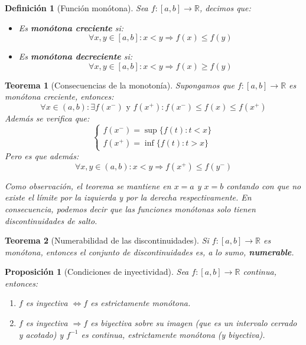 \documentclass[10pt,a4paper,openright]{book}
\newtheorem{teorema}{Teorema}[chapter]
\newtheorem{proposicion}{Proposición}[chapter]
\newtheorem{definicion}{Definición}[chapter]
\begin{document}
\begin{definicion}[Función monótona]
Sea $f:[a,b]\rightarrow \mathbb R$, decimos que:
\begin{itemize}
\item Es \textbf{monótona creciente} si:
$$\forall x,y\in [a,b]: x<y\Rightarrow f(x)\leq f(y)$$

\item Es \textbf{monótona decreciente} si:
$$\forall x,y\in [a,b]: x<y\Rightarrow f(x)\geq f(y)$$
\end{itemize}
\end{definicion}

\begin{teorema}[Consecuencias de la monotonía]
Supongamos que $f:[a,b]\rightarrow \mathbb R$ es monótona creciente, entonces:
$$\forall x\in (a,b):\exists f(x^-)\mbox{ y }f(x^+): f(x^-)\leq f(x)\leq f(x^+)$$
Además se verifica que:
$$\begin{cases}f(x^-)=\sup\{f(t): t<x\} \\ f(x^+)=\inf\{f(t): t>x\}\end{cases}$$
Pero es que además:
$$\forall x,y\in (a,b): x<y\Rightarrow f(x^+)\leq f(y^-)$$

Como observación, el teorema se mantiene en $x=a$ y $x=b$ contando con que no existe el límite por la izquierda y por la derecha respectivamente. En consecuencia, podemos decir que las funciones monótonas solo tienen discontinuidades de salto.
\end{teorema}

\begin{teorema}[Numerabilidad  de las discontinuidades]
Si $f:[a,b]\rightarrow \mathbb R$ es monótona, entonces el conjunto de discontinuidades es, a lo sumo, \textbf{numerable}.
\end{teorema}

\begin{proposicion}[Condiciones de inyectividad]
Sea $f:[a,b]\rightarrow \mathbb R$ continua, entonces:
\begin{enumerate}
\item $f$ es inyectiva $\Leftrightarrow f$ es estrictamente monótona.

\item $f$ es inyectiva $\Rightarrow f$ es biyectiva sobre su imagen (que es un intervalo cerrado y acotado) y $f^{-1}$ es continua, estrictamente monótona (y biyectiva).
\end{enumerate}
\end{proposicion}
\end{document}
